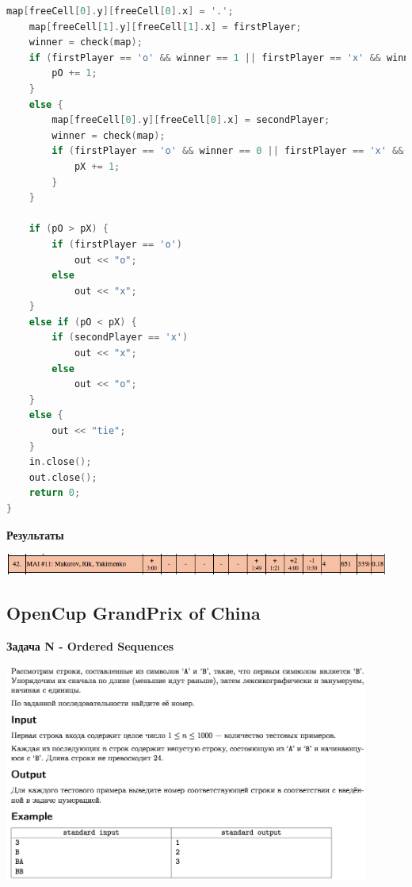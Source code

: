 \documentclass[a4paper,12pt]{article}
\begin{document}
\begin{lstlisting}[language=C++]
    map[freeCell[0].y][freeCell[0].x] = '.';
    map[freeCell[1].y][freeCell[1].x] = firstPlayer;
    winner = check(map);
    if (firstPlayer == 'o' && winner == 1 || firstPlayer == 'x' && winner == 0) {
        pO += 1;
    }
    else {
        map[freeCell[0].y][freeCell[0].x] = secondPlayer;
        winner = check(map);
        if (firstPlayer == 'o' && winner == 0 || firstPlayer == 'x' && winner == 1) {
            pX += 1;
        }
    }

    if (pO > pX) {
        if (firstPlayer == 'o')
            out << "o";
        else
            out << "x";
    }
    else if (pO < pX) {
        if (secondPlayer == 'x')
            out << "x";
        else
            out << "o";
    }
    else {
        out << "tie";
    }
    in.close();
    out.close();
    return 0;
}
\end{lstlisting}

\textbf{{\large Результаты}} \\
\begin{center}
\includegraphics[width=0.95\textwidth]{OC_Udmurtia/OC_Udmurtia_result.png}\\ [1cm]
\end{center}



%
%
\newpage
\subsection{OpenCup GrandPrix of China}

\textbf{{\large Задача N - Ordered Sequences}} \\
\begin{center}
\includegraphics[width=0.9\textwidth]{OC_China/OC_China_N.png}\\ [1cm]
\end{center}
\newpage
\end{document}
